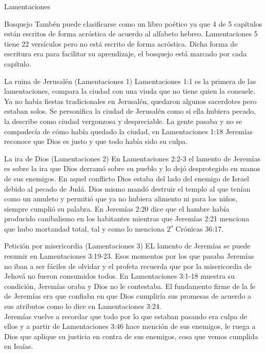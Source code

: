 \begin{section}{Lamentaciones}
\begin{itemize}
	\end{itemize}
	\begin{subsection}{Bosquejo}
		Tambén puede clasificarse como un libro poético ya que 4 de 5 capítulos están escritos de forma acróstica de acuerdo al alfabeto hebreo. Lamentaciones 5 tiene 22 versículos pero no está escrito de forma acróstica. Dicha forma de escritura era para facilitar su aprendizaje, el bosquejo está marcado por cada capítulo.
		\begin{subsubsection}{La ruina de Jerusalén (Lamentaciones 1)}
			Lamentaciones 1:1 es la primera de las lamentaciones, compara la ciudad con una viuda que no tiene quien la consuele. Ya no había fiestas tradicionales en Jerusalén, quedaron algunos sacerdotes pero estaban solos. Se personifica la ciudad de Jerusalén como si ella hubiera pecado, la describe como ciudad vergonzosa y despreciable.
			\newpage
			La gente pasaba y no se compadecía de cómo había quedado la ciudad, en Lamentaciones 1:18 Jeremías reconoce que Dios es justo y que todo había sido su culpa.\\
		\end{subsubsection}
		\begin{subsubsection}{La ira de Dios (Lamentaciones 2)}
			En Lamentaciones 2:2-3 el lamento de Jeremías es sobre la ira que Dios derramó sobre su pueblo y lo dejó desprotegido en manos de sus enemigos. En aquel conflicto Dios estaba del lado del enemigo de Israel debido al pecado de Judá. Dios mismo mandó destruir el templo al que tenían como un amuleto y permitió que ya no hubiera alimento ni para los niños, siempre cumplió su palabra. En Jeremías 2:20 dice que el hambre había producido canibalismo en los habitantes mientras que Jeremías 2:21 menciona que hubo mortandad total, tal y como lo menciona $2^{o}$ Crónicas 36:17.
		\end{subsubsection}
		\begin{subsubsection}{Petición por misericordia (Lamentaciones 3)}
			EL lamento de Jeremías se puede resumir en Lamentaciones 3:19-23. Esos momentos por los que pasaba Jeremías no iban a ser fáciles de olvidar y el profeta recuerda que por la misericordia de Jehová no fueron consumidos todos. En Lamentaciones 3:1-18 muestra su condición, Jeremías oraba y Dios no le contestaba. El fundamento firme de la fe de Jeremías era que confiaba en que Dios cumpliría sus promesas de acuerdo a sus atributos como lo dice en Lamentaciones 3:24.\\
			Jeremías vuelve a recordar que todo por lo que estaban pasando era culpa de ellos y a partir de Lamentaciones 3:46 hace mención de sus enemigos, le ruega a Dios que aplique su justicia en contra de sus enemigos, cosa que vemos cumplida en Isaías.

\end{subsubsection}
\end{subsection}
\end{section}
